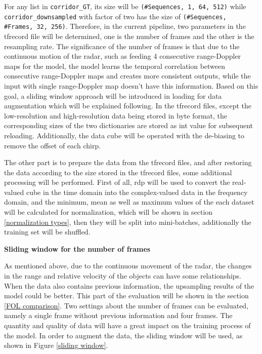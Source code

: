 For any list in \texttt{corridor\_GT}, its size will be \texttt{(\#Sequences, 1, 64, 512)} while \texttt{corridor\_downsampled} with factor of two has the size of \texttt{(\#Sequences, \#Frames, 32, 256)}. Therefore, in the current pipeline, two parameters in the \gls{tfrecord} file will be determined, one is the number of frames and the other is the resampling rate. The significance of the number of frames is that due to the continuous motion of the radar, such as feeding 4 consecutive range-Doppler maps for the model, the model learns the temporal correlation between consecutive range-Doppler maps and creates more consistent outputs, while the input with single range-Doppler map doesn't have this information. Based on this goal, a sliding window approach will be introduced in loading for data augmentation which will be explained following. In the \gls{tfrecord} files, except the low-resolution and high-resolution data being stored in byte format, the corresponding sizes of the two dictionaries are stored as int value for subsequent reloading. Additionally, the data cube will be operated with the de-biasing to remove the offset of each chirp.

The other part is to prepare the data from the \gls{tfrecord} files, and after restoring the data according to the size stored in the \gls{tfrecord} files, some additional processing will be performed. First of all, \gls{rdp} will be used to convert the real-valued cube in the time domain into the complex-valued data in the frequency domain, and the minimum, mean as well as maximum values of the each dataset will be calculated for normalization, which will be shown in section \ref{normalization types}, then they will be split into mini-batches, additionally the training set will be shuffled.

\begin{spacing}{1.5}
\textbf{\large{Sliding window for the number of frames}}
\end{spacing}

As mentioned above, due to the continuous movement of the radar, the changes in the range and relative velocity of the objects can have some relationships. When the data also contains previous information, the upsampling results of the model could be better. This part of the evaluation will be shown in the section \ref{FOL comparison}. Two settings about the number of frames can be evaluated, namely a single frame without previous information and four frames. The quantity and quality of data will have a great impact on the training process of the model. In order to augment the data, the sliding window will be used, as shown in Figure \ref{sliding window}.

